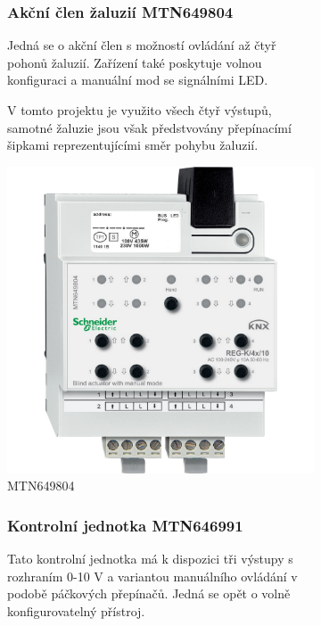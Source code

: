 \documentclass[12pt, a4paper,
twoside,        %
openright
]{report}
\begin{document}
\begin{figure}[h]
\centering
\begin{subfigure}{0.9\textwidth}
	\subsubsection{Akční člen žaluzií MTN649804}
	Jedná se o akční člen s možností ovládání až čtyř pohonů žaluzií. Zařízení také poskytuje volnou konfiguraci a manuální mod se signálními LED.


	\noindent V tomto projektu je využito všech čtyř výstupů, samotné žaluzie jsou však předstvovány přepínacímí šipkami reprezentujícími směr pohybu žaluzií.
 
		\centering
		\includegraphics[scale=0.09]{image/MTN649804.jpg}
		\caption{MTN649804}
		\label{image:3}
\end{subfigure}

\begin{subfigure}{0.9\textwidth}
	\subsubsection{Kontrolní jednotka MTN646991}
	Tato kontrolní jednotka má k dispozici tři výstupy s rozhraním 0-10 V a variantou manuálního ovládání v podobě páčkových přepínačů. Jedná se opět o volně konfigurovatelný přístroj.



\end{subfigure}
\end{figure}
\end{document}
